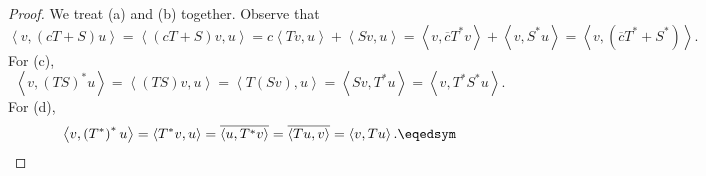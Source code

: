 \documentclass[linearalgebraII]{subfiles}
\begin{document}
    \begin{proof}
        We treat (a) and (b) together. Observe that
        \begin{equation*}
            \left\langle v, \left( cT+S \right)u \right\rangle = \left\langle \left( cT+S \right) v, u\right\rangle = c\left\langle Tv, u\right\rangle + \left\langle Sv, u\right\rangle  = \left\langle v, \overline{c} T^*v\right\rangle + \left\langle v, S^*u\right\rangle = \left\langle v, \left( \overline{c} T^*+S^* \right) \right\rangle .
        \end{equation*}
        For (c),
        \begin{equation*}
            \left\langle v, \left( TS \right) ^*u\right\rangle = \left\langle \left( TS \right) v, u\right\rangle = \left\langle T\left( Sv \right) ,u\right\rangle = \left\langle Sv, T^*u\right\rangle = \left\langle v, T^*S^*u\right\rangle . 
        \end{equation*}
        For (d),
        \begin{equation*}
            \left\langle v, \left( T^* \right) ^*u\right\rangle = \left\langle T^*v, u\right\rangle = \overline{\left\langle u, T^*v\right\rangle} = \overline{\left\langle Tu, v\right\rangle}  = \left\langle v, Tu\right\rangle . \eqedsym
        \end{equation*}
    \end{proof}
\end{document}
